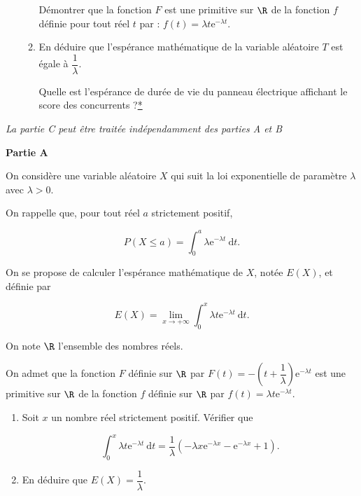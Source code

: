 \documentclass[12pt,french]{article}
\begin{document}
\begin{question}[subtitle={Asie 2015}]
\begin{enumerate}
\begin{enumerate}
Démontrer que la fonction $F$ est une primitive sur $\R$ de la fonction $f$ définie pour tout
réel $t$ par : $f(t) = \lambda t\text{e}^{- \lambda t}$.
		\item En déduire que l'espérance mathématique de la variable aléatoire $T$ est égale à $\dfrac{1}{\lambda}$.
		
Quelle est l'espérance de durée de vie du panneau électrique affichant le score des
concurrents ?\hyperlink{Index}{*}
	\end{enumerate}
\end{enumerate}

\end{question}

\begin{question}[subtitle={Antilles Guyane 2015}]
\emph{La partie C peut être traitée indépendamment des parties A et B}

\bigskip

\textbf{Partie A}

\medskip

On considère une variable aléatoire $X$ qui suit la loi exponentielle de paramètre $\lambda$ avec $\lambda > 0$.

On rappelle que, pour tout réel $a$ strictement positif,

\[P(X \leqslant  a) = \displaystyle\int_0^a \lambda\text{e}^{- \lambda t}\:\text{d}t.\]

On se propose de calculer l'espérance mathématique de $X$, notée $E(X)$, et définie par

\[E(X) = \displaystyle\lim_{x \to + \infty} \int_0^x \lambda t \text{e}^{- \lambda t}\:\text{d}t.\]

On note $\R$ l'ensemble des nombres réels.

On admet que la fonction $F$ définie sur $\R$ par $F(t) = - \left(t + \dfrac{1}{\lambda}\right)\text{e}^{- \lambda t}$ est une primitive sur $\R$ de la fonction $f$ définie sur $\R$ par $f(t) = \lambda t \text{e}^{- \lambda t}$.

\medskip

\begin{enumerate}
\item Soit $x$ un nombre réel strictement positif. Vérifier que

\[\displaystyle \int_0^x \lambda t \text{e}^{- \lambda t}\:\text{d}t = \dfrac{1}{\lambda}\left(- \lambda x \text{e}^{- \lambda x} -  \text{e}^{- \lambda x} + 1\right).\]

\item  En déduire que $E(X) = \dfrac{1}{\lambda}$.
\end{enumerate}


\end{question}
\end{document}
